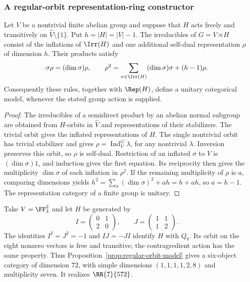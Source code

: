 \subsubsection{A regular-orbit representation-ring constructor}
\begin{proposition}\label{prop:regular-orbit-model}
Let $V$ be a nontrivial finite abelian group and suppose that $H$ acts
freely and transitively on $\widehat V\setminus\{1\}$. Put
$h=|H|=|V|-1$. The irreducibles of $G=V\rtimes H$ consist of the
inflations of $\Irr(H)$ and one additional self-dual representation
$\rho$ of dimension $h$. Their products satisfy
\begin{equation}\label{eq:regular-orbit-products}
 \sigma\rho=(\dim\sigma)\rho,\qquad
 \rho^2=\sum_{\sigma\in\Irr(H)}(\dim\sigma)\sigma+(h-1)\rho.
\end{equation}
Consequently these rules, together with $\Rep(H)$, define a unitary
categorical model, whenever the stated group action is supplied.
\end{proposition}
\begin{proof}
The irreducibles of a semidirect product by an abelian normal subgroup
are obtained from $H$-orbits in $\widehat V$ and representations of their
stabilizers. The trivial orbit gives the inflated representations of
$H$. The single nontrivial orbit has trivial stabilizer and gives
$\rho=\operatorname{Ind}_V^G\lambda$, for any nontrivial $\lambda$.
Inversion preserves this orbit, so $\rho$ is self-dual. Restriction of
an inflated $\sigma$ to $V$ is $(\dim\sigma)1$, and induction gives
the first equation. Its reciprocity then gives the multiplicity
$\dim\sigma$ of each inflation in $\rho^2$. If the remaining
multiplicity of $\rho$ is $a$, comparing dimensions yields
$h^2=\sum_\sigma(\dim\sigma)^2+ah=h+ah$, so $a=h-1$.
The representation category of a finite group is unitary.
\end{proof}

Take $V=\FF_3^2$ and let $H$ be generated by
\[
 I=\begin{pmatrix}0&1\\2&0\end{pmatrix},\qquad
 J=\begin{pmatrix}1&1\\1&2\end{pmatrix}.
\]
The identities $I^2=J^2=-1$ and $IJ=-JI$ identify $H$ with $Q_8$.
Its orbit on the eight nonzero vectors is free and transitive; the
contragredient action has the same property. Thus
Proposition~\ref{prop:regular-orbit-model} gives a six-object category
of dimension $72$, with simple dimensions $(1,1,1,1,2,8)$ and
multiplicity seven. It realizes $\RR{7}{572}$.


